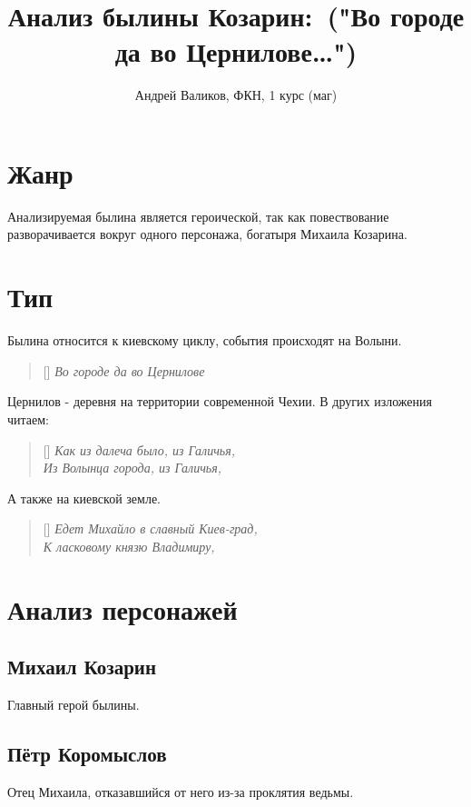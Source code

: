 \documentclass[12pt]{article}
\begin{document}
\title{Анализ былины \guillemotleft Козарин: ("Во городе да во Цернилове\ldots") \guillemotright}
\author{Андрей Валиков, ФКН, 1 курс (маг)}
\date{}
\maketitle

\section{Жанр}
Анализируемая былина является героической, так как повествование разворачивается вокруг одного персонажа, богатыря Михаила Козарина.

\section{Тип}
Былина относится к киевскому циклу, события происходят на Волыни.

\settowidth{\versewidth}{Богатырскому серцу розгоретися,}
\begin{verse}[\versewidth]
\itshape
Во городе да во Цернилове
\end{verse}

Цернилов - деревня на территории современной Чехии. В других изложения читаем:

\settowidth{\versewidth}{Богатырскому серцу розгоретися,}
\begin{verse}[\versewidth]
\itshape
Как из далеча было, из Галичья, \\
Из Волынца города, из Галичья,
\end{verse}

А также на киевской земле.
\settowidth{\versewidth}{Богатырскому серцу розгоретися,}
\begin{verse}[\versewidth]
\itshape
Едет Михайло в славный Киев-град, \\
К ласковому князю Владимиру,
\end{verse}


\section{Анализ персонажей}

\subsection{Михаил Козарин}
Главный герой былины.

\subsection{Пётр Коромыслов}
Отец Михаила, отказавшийся от него из-за проклятия ведьмы.
\end{document}
